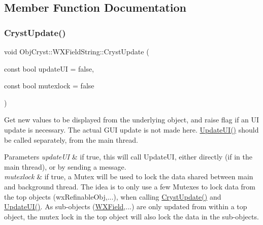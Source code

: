 \subsection{Member Function Documentation}
\mbox{\label{class_obj_cryst_1_1_w_x_field_string_acac0d32e4560531e1cab6af0071bb55f}} 
\subsubsection{\texorpdfstring{CrystUpdate()}{CrystUpdate()}}
{\footnotesize\ttfamily void Obj\+Cryst\+::\+W\+X\+Field\+String\+::\+Cryst\+Update (\begin{DoxyParamCaption}\item[{const bool}]{update\+UI = {\ttfamily false},  }\item[{const bool}]{mutexlock = {\ttfamily false} }\end{DoxyParamCaption})\hspace{0.3cm}{\ttfamily [virtual]}}

Get new values to be displayed from the underlying object, and raise flag if an UI update is necessary. The actual G\+UI update is not made here. \mbox{\hyperlink{class_obj_cryst_1_1_w_x_field_string_ae5d38d52534a9ccbc0f9c030fc447332}{Update\+U\+I()}} should be called separately, from the main thread.


\begin{DoxyParams}{Parameters}
{\em update\+UI} & if true, this will call Update\+UI, either directly (if in the main thread), or by sending a message. \\
\hline
{\em mutexlock} & if true, a Mutex will be used to lock the data shared between main and background thread. The idea is to only use a few Mutexes to lock data from the top objects (wx\+Refinable\+Obj,...), when calling \mbox{\hyperlink{class_obj_cryst_1_1_w_x_field_string_acac0d32e4560531e1cab6af0071bb55f}{Cryst\+Update()}} and \mbox{\hyperlink{class_obj_cryst_1_1_w_x_field_string_ae5d38d52534a9ccbc0f9c030fc447332}{Update\+U\+I()}}. As sub-\/objects (\mbox{\hyperlink{class_obj_cryst_1_1_w_x_field}{W\+X\+Field}},...) are only updated from within a top object, the mutex lock in the top object will also lock the data in the sub-\/objects. \\
\hline
\end{DoxyParams}


